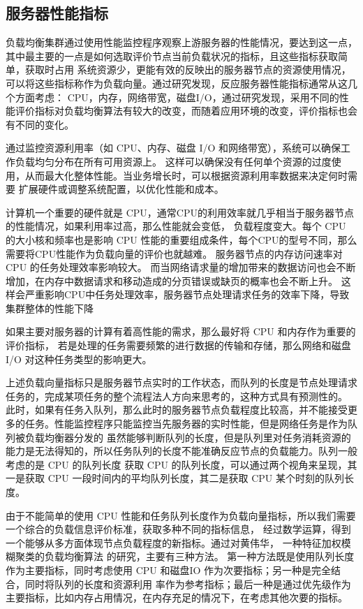 \subsection{服务器性能指标}

负载均衡集群通过使用性能监控程序观察上游服务器的性能情况，要达到这一点，其中最主要的一点是如何选取评价节点当前负载状况的指标，且这些指标获取简单，获取时占用
系统资源少，更能有效的反映出的服务器节点的资源使用情况，可以将这些指标称作为负载向量。通过研究发现，反应服务器性能指标通常从这几个方面考虑：
CPU，内存，网络带宽，磁盘I/O，通过研究发现，采用不同的性能评价指标对负载均衡算法有较大的改变，而随着应用环境的改变，评价指标也会有不同的变化。

通过监控资源利用率（如 CPU、内存、磁盘 I/O 和网络带宽），系统可以确保工作负载均匀分布在所有可用资源上。
这样可以确保没有任何单个资源的过度使用，从而最大化整体性能。当业务增长时，可以根据资源利用率数据来决定何时需要
扩展硬件或调整系统配置，以优化性能和成本。

计算机一个重要的硬件就是 CPU，通常CPU的利用效率就几乎相当于服务器节点的性能情况，如果利用率过高，那么性能就会变低，
负载程度变大。每个 CPU 的大小核和频率也是影响 CPU 性能的重要组成条件，每个CPU的型号不同，那么需要将CPU性能作为负载向量的评价也就越难。
服务器节点的内存访问速率对 CPU 的任务处理效率影响较大。
而当网络请求量的增加带来的数据访问也会不断增加，在内存中数据请求和移动造成的分页错误或缺页的概率也会不断上升。
这样会严重影响CPU中任务处理效率，服务器节点处理请求任务的效率下降，导致集群整体的性能下降

如果主要对服务器的计算有着高性能的需求，那么最好将 CPU 和内存作为重要的评价指标，
若是处理的任务需要频繁的进行数据的传输和存储，那么网络和磁盘 I/O 对这种任务类型的影响更大。

上述负载向量指标只是服务器节点实时的工作状态\cite{mahato2017scheduling}，而队列的长度是节点处理请求任务的，完成某项任务的整个流程法人方向来思考的，这种方式具有预测性的。
此时，如果有任务入队列，那么此时的服务器节点负载程度比较高，并不能接受更多的任务。性能监控程序只能监控当先服务器的实时性能，但是网络任务是作为队列被负载均衡器分发的
虽然能够判断队列的长度，但是队列里对任务消耗资源的能力是无法得知的，所以任务队列的长度不能准确反应节点的负载能力。队列一般考虑的是 CPU 的队列长度
获取 CPU 的队列长度，可以通过两个视角来呈现，其一是获取 CPU 一段时间内的平均队列长度，其二是获取 CPU 某个时刻的队列长度。

由于不能简单的使用 CPU 性能和任务队列长度作为负载向量指标，所以我们需要一个综合的负载信息评价标准，获取多种不同的指标信息，
经过数学运算，得到一个能够从多方面体现节点负载程度的新指标。通过对黄伟华，
一种特征加权模糊聚类的负载均衡算法\cite{黄伟华2017一种特征加权模糊聚类的负载均衡算法} 的研究，主要有三种方法。
第一种方法既是使用队列长度作为主要指标，同时考虑使用 CPU 和磁盘IO 作为次要指标；另一种是完全结合，同时将队列的长度和资源利用
率作为参考指标；最后一种是通过优先级作为主要指标，比如内存占用情况，在内存充足的情况下，在考虑其他次要的指标。

